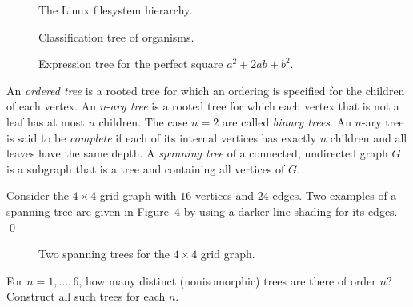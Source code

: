 \begin{figure}[!htbp]
\centering
{}

\caption{The Linux filesystem hierarchy.}
\label{fig:trees_forests:filesystem_hierarchy}
\end{figure}

\begin{figure}[!htbp]
\centering
{}

\caption{Classification tree of organisms.}
\label{fig:trees_forests:classification_tree_organisms}
\end{figure}

\begin{figure}[!htbp]
\centering
{}

\caption{Expression tree for the perfect square $a^2 + 2ab + b^2$.}
\label{fig:trees_forests:expression_tree_perfect_square}
\end{figure}

An \emph{ordered tree} is a rooted tree for which
an ordering is specified for the children of each vertex. An
$n$-\emph{ary tree} is a rooted tree for which
each vertex that is not a leaf has at most $n$ children. The case
$n = 2$ are called \emph{binary trees}. An $n$-ary
tree is said to be \emph{complete} if each of its internal vertices
has exactly $n$ children and all leaves have the same depth. A
\emph{spanning tree} of a connected, undirected
graph $G$ is a subgraph that is a tree and containing all vertices of
$G$.

\begin{example}
\label{eg:trees_forests:spanning_tree}
{\rm
Consider the $4 \times 4$ grid graph with $16$ vertices and
$24$ edges. Two examples of a spanning tree are given in
Figure~\ref{fig:trees_forests:grid_graph_spanning_trees} by using a
darker line shading for its edges.}
\qed
\end{example}

\begin{figure}[!htbp]
\centering

\caption{Two spanning trees for the $4 \times 4$ grid graph.}
\label{fig:trees_forests:grid_graph_spanning_trees}
\end{figure}

\begin{example}
For $n = 1, \dots, 6$, how many distinct (nonisomorphic) trees are
there of order $n$? Construct all such trees for each $n$.
\end{example}

